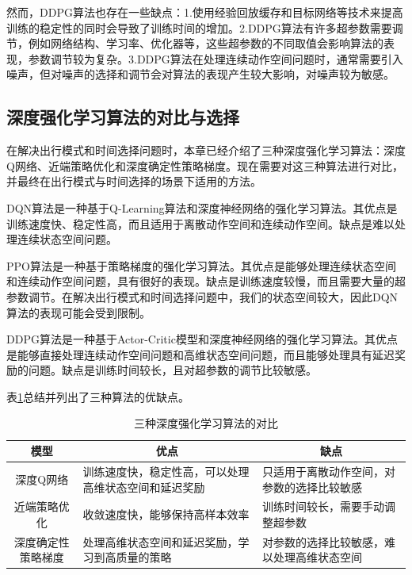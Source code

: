 然而，DDPG算法也存在一些缺点：1.使用经验回放缓存和目标网络等技术来提高训练的稳定性的同时会导致了训练时间的增加。2.DDPG算法有许多超参数需要调节，例如网络结构、学习率、优化器等，这些超参数的不同取值会影响算法的表现，参数调节较为复杂。3.DDPG算法在处理连续动作空间问题时，通常需要引入噪声，但对噪声的选择和调节会对算法的表现产生较大影响，对噪声较为敏感。

\subsection{深度强化学习算法的对比与选择}

在解决出行模式和时间选择问题时，本章已经介绍了三种深度强化学习算法：深度Q网络、近端策略优化和深度确定性策略梯度。现在需要对这三种算法进行对比，并最终在出行模式与时间选择的场景下适用的方法。

DQN算法是一种基于Q-Learning算法和深度神经网络的强化学习算法。其优点是训练速度快、稳定性高，而且适用于离散动作空间和连续动作空间。缺点是难以处理连续状态空间问题。

PPO算法是一种基于策略梯度的强化学习算法。其优点是能够处理连续状态空间和连续动作空间问题，具有很好的表现。缺点是训练速度较慢，而且需要大量的超参数调节。在解决出行模式和时间选择问题中，我们的状态空间较大，因此DQN算法的表现可能会受到限制。


DDPG算法是一种基于Actor-Critic模型和深度神经网络的强化学习算法。其优点是能够直接处理连续动作空间问题和高维状态空间问题，而且能够处理具有延迟奖励的问题。缺点是训练时间较长，且对超参数的调节比较敏感。

表\ref{tab:2_1}总结并列出了三种算法的优缺点。

\renewcommand{\arraystretch}{1.5} %
\begin{table}[htbp]
\centering
\caption{三种深度强化学习算法的对比}
\label{tab:2_1}
\begin{tabular}{cll}
\toprule
模型 & \multicolumn{1}{c}{优点}       & \multicolumn{1}{c}{缺点}     \\
\midrule
深度Q网络                       & \parbox[t]{5.5cm}{训练速度快，稳定性高，可以处理高维状态空间和延迟奖励}      & \parbox[t]{5.5cm}{只适用于离散动作空间，对参数的选择比较敏感 }                       \\
近端策略优化                       & \parbox[t]{5.5cm}{收敛速度快，能够保持高样本效率}    & \parbox[t]{5.5cm}{训练时间较长，需要手动调整超参数}              \\ 
深度确定性策略梯度                    & \parbox[t]{5.5cm}{处理高维状态空间和延迟奖励，学习到高质量的策略}   & \parbox[t]{5.5cm}{对参数的选择比较敏感，难以处理高维状态空间}              \\
\bottomrule
\end{tabular}
\end{table}



